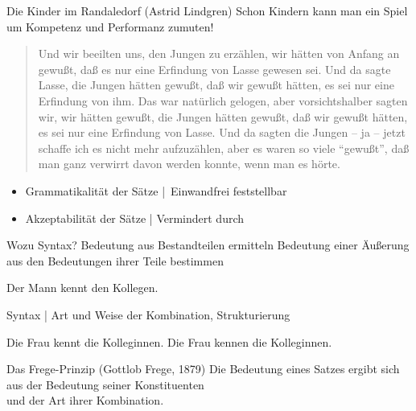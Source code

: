  
\begin{frame}
  {Die Kinder im Randaledorf (Astrid Lindgren)}
  \onslide<+->
  \onslide<+->
  Schon Kindern kann man ein Spiel um Kompetenz und Performanz zumuten!\\
  \Zeile
  \onslide<+->
  \begin{quote}
    Und wir beeilten uns, den Jungen zu erzählen, wir hätten von Anfang an gewußt, daß es nur eine
    Erfindung von Lasse gewesen sei. Und da sagte Lasse, die Jungen hätten gewußt, daß wir gewußt
    hätten, es sei nur eine Erfindung von ihm. Das war natürlich gelogen, aber vorsichtshalber sagten
    wir, wir hätten gewußt, die Jungen hätten gewußt, daß wir gewußt hätten, es sei nur eine Erfindung
    von Lasse. Und da sagten die Jungen -- ja -- jetzt schaffe ich es nicht mehr aufzuzählen, aber es
    waren so viele "`gewußt"', daß man ganz verwirrt davon werden konnte, wenn man es hörte.
  \end{quote}
  \Zeile
  \begin{itemize}[<+->]
    \item \alert{Grammatikalität} der Sätze | Einwandfrei feststellbar
    \item \alert{Akzeptabilität} der Sätze | Vermindert durch 
  \end{itemize}
\end{frame}

\begin{frame}
  {Wozu Syntax? Bedeutung aus Bestandteilen ermitteln}
  \onslide<+->
  \onslide<+->
  Bedeutung einer Äußerung aus den Bedeutungen ihrer Teile bestimmen\\
  \Viertelzeile
  \onslide<+->
  \begin{exe}
    \ex Der Mann kennt den Kollegen.
  \end{exe}
  \Halbzeile
  \onslide<+->
  \alert{Syntax} | Art und Weise der Kombination, Strukturierung\\
  \Viertelzeile
  \onslide<+->
  \begin{exe}
    \ex
    \begin{xlist}
      \ex Die Frau kennt die Kolleginnen.
      \ex Die Frau kennen die Kolleginnen.
    \end{xlist}
  \end{exe}
  \Halbzeile
  \onslide<+->
  \begin{block}
    {Das Frege-Prinzip (Gottlob Frege, 1879)}
    Die Bedeutung eines Satzes ergibt sich aus der Bedeutung seiner Konstituenten\\
    und der Art ihrer Kombination.
  \end{block}
\end{frame}
 

